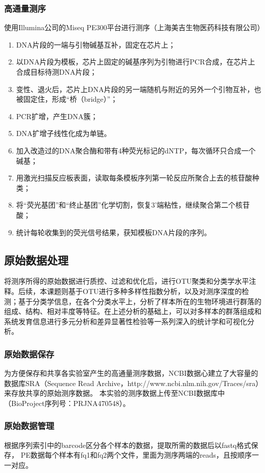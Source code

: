       \subsubsection{高通量测序}
      使用Illumina公司的Miseq PE300平台进行测序（上海美吉生物医药科技有限公司）
        \begin{enumerate}
          \item DNA片段的一端与引物碱基互补，固定在芯片上；
          \item 以DNA片段为模板，芯片上固定的碱基序列为引物进行PCR合成，在芯片上合成目标待测DNA片段；
          \item 变性、退火后，芯片上DNA片段的另一端随机与附近的另外一个引物互补，也被固定住，形成“桥（bridge）”；
          \item PCR扩增，产生DNA簇；
          \item DNA扩增子线性化成为单链。
          \item 加入改造过的DNA聚合酶和带有4种荧光标记的dNTP，每次循环只合成一个碱基；
          \item 用激光扫描反应板表面，读取每条模板序列第一轮反应所聚合上去的核苷酸种类；
          \item 将“荧光基团”和“终止基团”化学切割，恢复3'端粘性，继续聚合第二个核苷酸；
          \item 统计每轮收集到的荧光信号结果，获知模板DNA片段的序列。
        \end{enumerate}

  \subsection{原始数据处理}
  \label{原始数据处理}
  将测序所得的原始数据进行质控、过滤和优化后，进行OTU聚类和分类学水平注释。后续，本课题则基于OTU进行多种多样性指数分析，以及对测序深度的检测；基于分类学信息，在各个分类水平上，分析了样本所在的生物环境进行群落的组成、结构、相对丰度等特征。在上述分析的基础上，可以对多样本的群落组成和系统发育信息进行多元分析和差异显著性检验等一系列深入的统计学和可视化分析。
    \subsubsection{原始数据保存}
    为方便保存和共享各实验室产生的高通量测序数据，NCBI数据心建立了大容量的数据库SRA（Sequence Read Archive，http://www.ncbi.nlm.nih.gov/Traces/sra）来存放共享的原始测序数据。
    本实验的测序数据上传至NCBI数据库中（BioProject序列号：PRJNA470548）。
    \subsubsection{原始数据管理}
    根据序列索引中的barcode区分各个样本的数据，提取所需的数据后以fastq格式保存， PE数据每个样本有fq1和fq2两个文件，里面为测序两端的reads，且按顺序一一对应。

